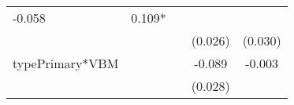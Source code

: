 \documentclass[12pt,twoside]{reedthesis}
\begin{document}
\begin{longtable}[]{@{}lcccc@{}}
\begin{minipage}[t]{0.14\columnwidth}
  -0.058\strut
  \end{minipage} & \begin{minipage}[t]{0.14\columnwidth}\centering\strut
  0.109*\strut
  \end{minipage}\tabularnewline
  \begin{minipage}[t]{0.26\columnwidth}\raggedright\strut
  \strut
  \end{minipage} & \begin{minipage}[t]{0.12\columnwidth}\centering\strut
  \strut
  \end{minipage} & \begin{minipage}[t]{0.13\columnwidth}\centering\strut
  \strut
  \end{minipage} & \begin{minipage}[t]{0.14\columnwidth}\centering\strut
  (0.026)\strut
  \end{minipage} & \begin{minipage}[t]{0.14\columnwidth}\centering\strut
  (0.030)\strut
  \end{minipage}\tabularnewline
  \begin{minipage}[t]{0.26\columnwidth}\raggedright\strut
  typePrimary*VBM\strut
  \end{minipage} & \begin{minipage}[t]{0.12\columnwidth}\centering\strut
  \strut
  \end{minipage} & \begin{minipage}[t]{0.13\columnwidth}\centering\strut
  \strut
  \end{minipage} & \begin{minipage}[t]{0.14\columnwidth}\centering\strut
  -0.089\strut
  \end{minipage} & \begin{minipage}[t]{0.14\columnwidth}\centering\strut
  -0.003\strut
  \end{minipage}\tabularnewline
  \begin{minipage}[t]{0.26\columnwidth}\raggedright\strut
  \strut
  \end{minipage} & \begin{minipage}[t]{0.12\columnwidth}\centering\strut
  \strut
  \end{minipage} & \begin{minipage}[t]{0.13\columnwidth}\centering\strut
  \strut
  \end{minipage} & \begin{minipage}[t]{0.14\columnwidth}\centering\strut
  (0.028)\strut
  \end{minipage} & \begin{minipage}[t]{0.14\columnwidth}\centering\strut

\end{minipage}
\end{longtable}
\end{document}
